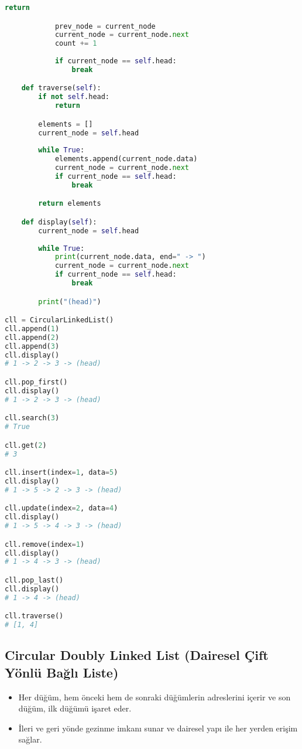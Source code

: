 \begin{lstlisting}[language=Python]
                return

            prev_node = current_node
            current_node = current_node.next
            count += 1
            
            if current_node == self.head:
                break

    def traverse(self):
        if not self.head:
            return

        elements = []
        current_node = self.head
        
        while True:
            elements.append(current_node.data)
            current_node = current_node.next
            if current_node == self.head:
                break

        return elements

    def display(self):
        current_node = self.head
        
        while True:
            print(current_node.data, end=" -> ")
            current_node = current_node.next
            if current_node == self.head:
                break

        print("(head)")

cll = CircularLinkedList()
cll.append(1)
cll.append(2)
cll.append(3)
cll.display()
# 1 -> 2 -> 3 -> (head)

cll.pop_first()
cll.display()
# 1 -> 2 -> 3 -> (head)

cll.search(3)
# True

cll.get(2)
# 3

cll.insert(index=1, data=5)
cll.display()
# 1 -> 5 -> 2 -> 3 -> (head)

cll.update(index=2, data=4)
cll.display()
# 1 -> 5 -> 4 -> 3 -> (head)

cll.remove(index=1)
cll.display()
# 1 -> 4 -> 3 -> (head)

cll.pop_last()
cll.display()
# 1 -> 4 -> (head)

cll.traverse()
# [1, 4]
\end{lstlisting}

\newpage

\subsection{Circular Doubly Linked List (Dairesel Çift Yönlü Bağlı Liste)}

\begin{itemize}
    \item Her düğüm, hem önceki hem de sonraki düğümlerin adreslerini içerir ve son düğüm, ilk düğümü işaret eder.
    \item İleri ve geri yönde gezinme imkanı sunar ve dairesel yapı ile her yerden erişim sağlar.
\end{itemize}

